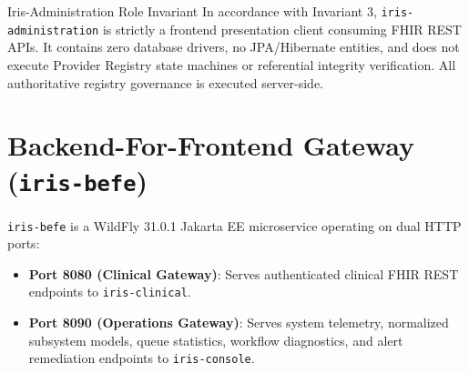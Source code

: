 \begin{principlebox}{Iris-Administration Role Invariant}
In accordance with Invariant 3, \texttt{iris-administration} is strictly a frontend presentation client consuming FHIR REST APIs. It contains zero database drivers, no JPA/Hibernate entities, and does not execute Provider Registry state machines or referential integrity verification. All authoritative registry governance is executed server-side.
\end{principlebox}

\section{Backend-For-Frontend Gateway (\texttt{iris-befe})}

\texttt{iris-befe} is a WildFly 31.0.1 Jakarta EE microservice operating on dual HTTP ports:
\begin{itemize}
    \item \textbf{Port 8080 (Clinical Gateway)}: Serves authenticated clinical FHIR REST endpoints to \texttt{iris-clinical}.
    \item \textbf{Port 8090 (Operations Gateway)}: Serves system telemetry, normalized subsystem models, queue statistics, workflow diagnostics, and alert remediation endpoints to \texttt{iris-console}.
\end{itemize}


